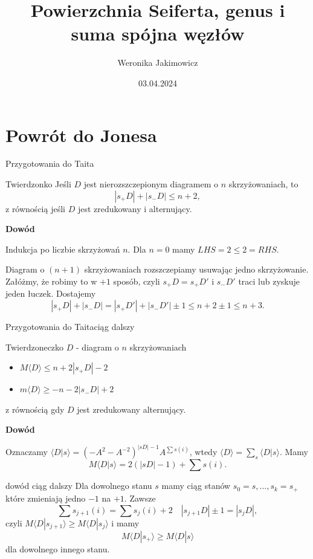 \documentclass{beamer}
\title{Powierzchnia Seiferta, genus i suma spójna węzłów}
\date{03.04.2024}
\author{Weronika Jakimowicz}
\begin{document}
\begin{frame}
\titlepage
\end{frame}

\section{Powrót do Jonesa}
\begin{frame}{Przygotowania do Taita}
  \begin{block}{Twierdzonko} 
    Jeśli $D$ jest nierozszczepionym diagramem o $n$ skrzyżowaniach, to 
    $$|s_+D|+|s_-D|\leq n+2,$$
    z równością jeśli $D$ jest zredukowany i alternujący.
  \end{block}
  \textbf{\color{orange}Dowód}
  \medskip

  Indukcja po liczbie skrzyżowań $n$. Dla $n=0$ mamy $LHS=2\leq 2=RHS$.

  Diagram o $(n+1)$ skrzyżowaniach rozszczepiamy usuwając jedno skrzyżowanie. Załóżmy, że robimy to w $+1$ sposób, czyli $s_+D=s_+D'$ i $s_-D'$ traci lub zyskuje jeden łuczek. Dostajemy
  $$|s_+D|+|s_-D|=|s_+D'|+|s_-D'|\pm 1\leq n+2\pm 1\leq n+3.$$
\end{frame}
\begin{frame}{Przygotowania do Taita}{ciąg dalszy}
  \begin{block}{Twierdzoneczko}
    $D$ - diagram o $n$ skrzyżowaniach
    \begin{itemize}
      \item $M\langle D\rangle\leq n+2|s_+D|-2$
      \item $m\langle D\rangle \geq -n-2|s_-D|+2$
    \end{itemize}
    z równością gdy $D$ jest zredukowany alternujący.
  \end{block}
  \textbf{\color{orange}Dowód}
  \medskip 

  Oznaczamy $\langle D|s\rangle=(-A^2-A^{-2})^{|sD|-1}A^{\sum s(i)} $, wtedy $\langle D\rangle =\sum_s \langle D|s\rangle$. Mamy 
  $$M\langle D|s\rangle =2(|sD|-1)+\sum s(i).$$
\end{frame}
\begin{frame}{}{dowód ciąg dalszy}
  Dla dowolnego stanu $s$ mamy ciąg stanów $s_0=s,...,s_k=s_+$ które zmieniają jedno $-1$ na $+1$. Zawsze
  $$\sum s_{j+1}(i)=\sum s_{j}(i)+2\quad |s_{j+1}D|\pm 1=|s_jD|,$$
  czyli $M\langle D|s_{j+1}\rangle\geq M\langle D|s_j\rangle$ i mamy 
  $$M\langle D|s_+\rangle\geq M\langle D|s\rangle$$
  dla dowolnego innego stanu.
\end{frame}
\end{document}
